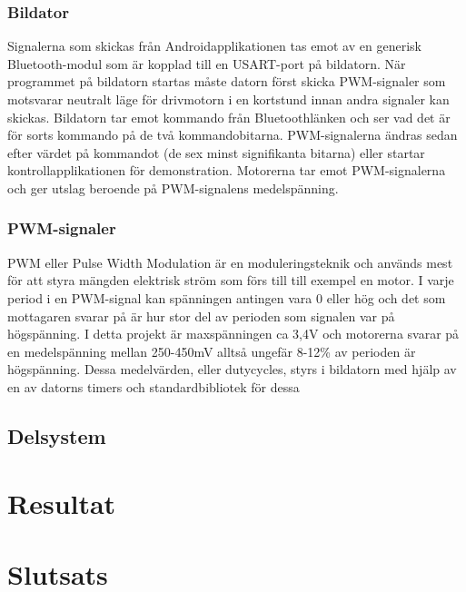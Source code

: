 \documentclass[a4paper]{article}
\begin{document}
\subsubsection{Bildator}
Signalerna som skickas från Androidapplikationen tas emot av en generisk Bluetooth-modul som är kopplad till en USART-port på bildatorn. När programmet på bildatorn startas måste datorn först skicka PWM-signaler som motsvarar neutralt läge för drivmotorn i en kortstund innan andra signaler kan skickas. Bildatorn tar emot kommando från Bluetoothlänken och ser vad det är för sorts kommando på de två kommandobitarna. PWM-signalerna ändras sedan efter värdet på kommandot (de sex minst signifikanta bitarna) eller startar kontrollapplikationen för demonstration. Motorerna tar emot PWM-signalerna och ger utslag beroende på PWM-signalens medelspänning.

\subsubsection{PWM-signaler}
PWM eller Pulse Width Modulation är en moduleringsteknik och används mest för att styra mängden elektrisk ström som förs till till exempel en motor. I varje period i en PWM-signal kan spänningen antingen vara 0 eller hög och det som mottagaren svarar på är hur stor del av perioden som signalen var på högspänning. I detta projekt är maxspänningen ca 3,4V och motorerna svarar på en medelspänning mellan 250-450mV alltså ungefär 8-12\% av perioden är högspänning. Dessa medelvärden, eller dutycycles, styrs i bildatorn med hjälp av en av datorns timers och standardbibliotek för dessa

\subsection{Delsystem}




\section{Resultat}




\section{Slutsats}



\newpage


\end{document}
